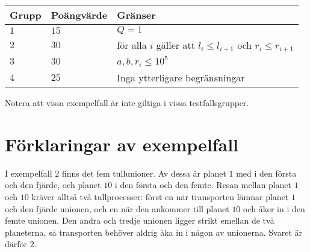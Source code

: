 \noindent
\begin{tabular}{| l | l | l |}
  \hline
  Grupp & Poängvärde & Gränser \\ \hline
  $1$   & $15$        & $Q=1$  \\ \hline
  $2$   & $30$        & för alla $i$ gäller att $l_i \le l_{i + 1}$ och $r_i \le r_{i+1}$ \\ \hline
  $3$   & $30$       & $ a,b,r_i \leq 10^5$ \\ \hline
  $4$   & $25$       & Inga ytterligare begränsningar \\ \hline
\end{tabular}

Notera att vissa exempelfall är inte giltiga i vissa testfallsgrupper.

\section*{Förklaringar av exempelfall}
I exempelfall $2$ finns det fem tullunioner.
Av dessa är planet $1$ med i den första och den fjärde, och planet $10$ i den första och den femte.
Resan mellan planet $1$ och $10$ kräver alltså två tullprocesser: först en när transporten lämnar planet $1$ och den fjärde unionen, och en när den ankommer till planet $10$ och åker in i den femte unionen.
Den andra och tredje unionen ligger strikt emellan de två planeterna, så transporten behöver aldrig åka in i någon av unionerna.
Svaret är därför $2$.
